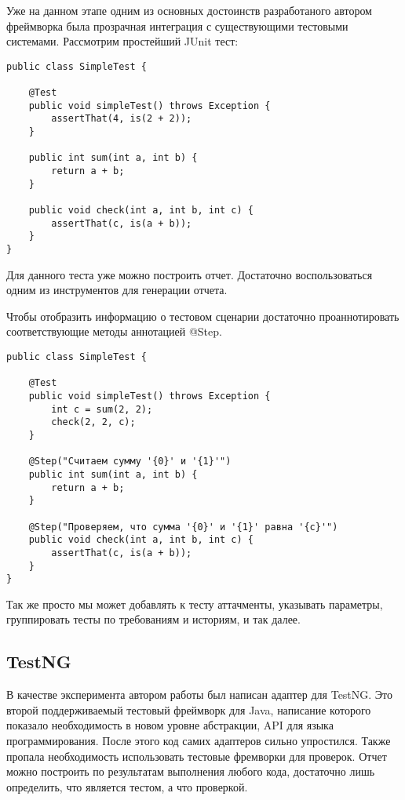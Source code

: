 Уже на данном этапе одним из основных достоинств разработаного автором фреймворка была прозрачная интеграция с существующими тестовыми системами. Рассмотрим простейший JUnit тест:
 
\begin{lstlisting}[caption=Простой JUnit тест.]
public class SimpleTest {

    @Test
    public void simpleTest() throws Exception {
        assertThat(4, is(2 + 2));
    }
    
    public int sum(int a, int b) {
		return a + b;
	}    
    
    public void check(int a, int b, int c) {
    	assertThat(c, is(a + b));	
    }
}
\end{lstlisting}

Для данного теста уже можно построить отчет. Достаточно воспользоваться одним из инструментов для генерации отчета.

Чтобы отобразить информацию о тестовом сценарии достаточно проаннотировать соответствующие методы аннотацией @Step.

\begin{lstlisting}[caption=Простой JUnit тест с добавлением шагов.]
public class SimpleTest {

    @Test
    public void simpleTest() throws Exception {
        int c = sum(2, 2);
        check(2, 2, c);
    }
    
    @Step("Считаем сумму '{0}' и '{1}'")
    public int sum(int a, int b) {
		return a + b;
	}    
    
    @Step("Проверяем, что сумма '{0}' и '{1}' равна '{c}'")
    public void check(int a, int b, int c) {
    	assertThat(c, is(a + b));	
    }
}
\end{lstlisting}

Так же просто мы может добавлять к тесту аттачменты, указывать параметры, группировать тесты по требованиям и историям, и так далее.

\subsection{TestNG}

В качестве эксперимента автором работы был написан адаптер для TestNG. Это второй поддерживаемый тестовый фреймворк для Java, написание которого показало необходимость в новом уровне абстракции, API для языка программирования. После этого код самих адаптеров сильно упростился. Также пропала необходимость использовать тестовые фремворки для проверок. Отчет можно построить по результатам выполнения любого кода, достаточно лишь определить, что является тестом, а что проверкой.

